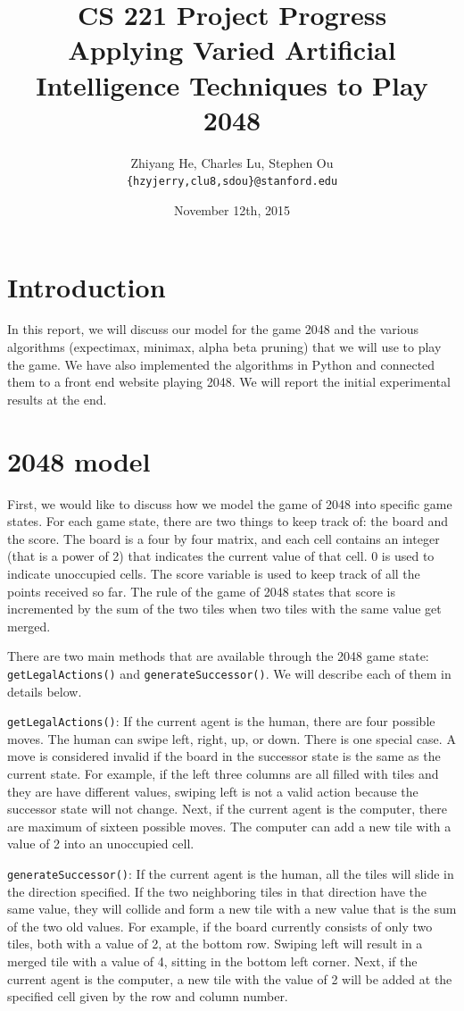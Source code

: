 \documentclass[11pt]{article}
\title{CS 221 Project Progress \\ Applying Varied Artificial Intelligence Techniques to Play 2048}
\author{Zhiyang He, Charles Lu, Stephen Ou \\ \texttt{\{hzyjerry,clu8,sdou\}@stanford.edu}}
\date{November 12th, 2015}
\begin{document}
\maketitle

\section{Introduction}

In this report, we will discuss our model for the game 2048 and the various algorithms (expectimax, minimax, alpha beta pruning) that we will use to play the game. We have also implemented the algorithms in Python and connected them to a front end website playing 2048. We will report the initial experimental results at the end.

\section{2048 model}

First, we would like to discuss how we model the game of 2048 into specific game states. For each game state, there are two things to keep track of: the board and the score. The board is a four by four matrix, and each cell contains an integer (that is a power of 2) that indicates the current value of that cell. 0 is used to indicate unoccupied cells. The score variable is used to keep track of all the points received so far. The rule of the game of 2048 states that score is incremented by the sum of the two tiles when two tiles with the same value get merged.

There are two main methods that are available through the 2048 game state: \texttt{getLegalActions()} and \texttt{generateSuccessor()}. We will describe each of them in details below.

\texttt{getLegalActions()}: If the current agent is the human, there are four possible moves. The human can swipe left, right, up, or down. There is one special case. A move is considered invalid if the board in the successor state is the same as the current state. For example, if the left three columns are all filled with tiles and they are have different values, swiping left is not a valid action because the successor state will not change. Next, if the current agent is the computer, there are maximum of sixteen possible moves. The computer can add a new tile with a value of 2 into an unoccupied cell.

\texttt{generateSuccessor()}: If the current agent is the human, all the tiles will slide in the direction specified. If the two neighboring tiles in that direction have the same value, they will collide and form a new tile with a new value that is the sum of the two old values. For example, if the board currently consists of only two tiles, both with a value of 2, at the bottom row. Swiping left will result in a merged tile with a value of 4, sitting in the bottom left corner. Next, if the current agent is the computer, a new tile with the value of 2 will be added at the specified cell given by the row and column number.
\end{document}
